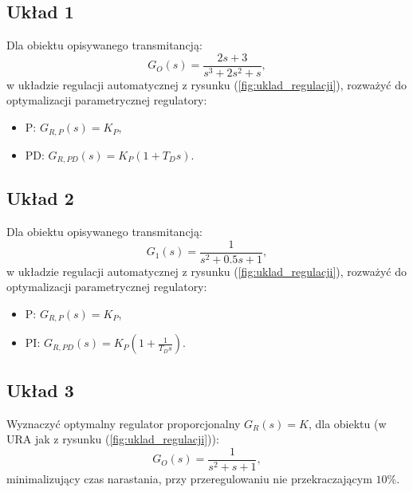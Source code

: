 \documentclass{article}
\begin{document}
    \subsection{Układ 1}
    Dla obiektu opisywanego transmitancją:
    \begin{equation}
        \label{eq:system_1}
        G_{O}(s) = \frac{2s+3}{s^3+2s^2+s},
    \end{equation}
    w układzie regulacji automatycznej z rysunku (\ref{fig:uklad_regulacji}), rozważyć do optymalizacji parametrycznej regulatory:
    \begin{itemize}
        \item P: $G_{R,P}(s) = K_{P}$,
        \item PD: $G_{R,PD}(s) = K_{P}(1 + T_{D}s)$.
    \end{itemize}

    \subsection{Układ 2}
    Dla obiektu opisywanego transmitancją:
    \begin{equation}
        \label{eq:system_1}
        G_{1}(s) = \frac{1}{s^2+0.5s+1},
    \end{equation}
    w układzie regulacji automatycznej z rysunku (\ref{fig:uklad_regulacji}), rozważyć do optymalizacji parametrycznej regulatory:
    \begin{itemize}
        \item P: $G_{R,P}(s) = K_{P}$,
        \item PI: $G_{R,PD}(s) = K_{P}(1 + \frac{1}{T_{D}s})$.
    \end{itemize}

    \subsection{Układ 3}
    Wyznaczyć optymalny regulator proporcjonalny $G_{R}(s) = K$, dla obiektu (w URA jak z rysunku (\ref{fig:uklad_regulacji})):
    $$
        G_{O}(s) = \frac{1}{s^2 + s + 1},
    $$
    minimalizujący czas narastania, przy przeregulowaniu nie przekraczającym $10\%$.
\end{document}
